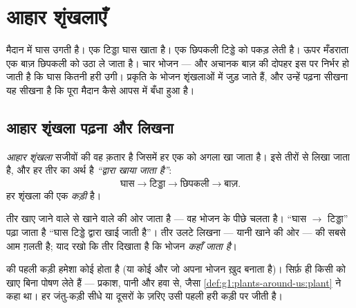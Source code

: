 \chapter{आहार शृंखलाएँ}\label{ch:g3:food-chains}

मैदान में घास उगती है। एक टिड्डा घास खाता है। एक छिपकली टिड्डे को पकड़
लेती है। ऊपर मँडराता एक बाज़ छिपकली को उठा ले जाता है। चार भोजन --- और
अचानक बाज़ की दोपहर इस पर निर्भर हो जाती है कि घास कितनी हरी उगी।
प्रकृति के भोजन शृंखलाओं में जुड़ जाते हैं, और उन्हें पढ़ना सीखना यह
सीखना है कि पूरा मैदान कैसे आपस में बँधा हुआ है।

\section{आहार शृंखला पढ़ना और लिखना}

\begin{definition}[आहार शृंखला]\label{def:g3:food-chains:chain}
\emph{आहार शृंखला} सजीवों की वह क़तार है जिसमें हर
एक को अगला खा जाता है। इसे तीरों से लिखा जाता है, और हर तीर का अर्थ है
\emph{``द्वारा खाया जाता है''}:
\[
\text{घास} \longrightarrow \text{टिड्डा}
\longrightarrow \text{छिपकली} \longrightarrow \text{बाज़}.
\]
हर  शृंखला की एक \emph{कड़ी} है।
\end{definition}

\begin{remark}[तीर की दिशा का ध्यान रखो]\label{rem:g3:food-chains:arrow}
तीर खाए जाने वाले से खाने वाले की ओर जाता है --- वह भोजन के पीछे चलता
है। ``घास $\rightarrow$ टिड्डा'' पढ़ा जाता है ``घास टिड्डे द्वारा खाई
जाती है''। तीर उलटे लिखना --- यानी खाने की ओर ---  की सबसे
आम ग़लती है; याद रखो कि तीर दिखाता है कि भोजन \emph{कहाँ जाता है}।
\end{remark}

\begin{proposition}[हर शृंखला किसी पौधे से शुरू होती है]\label{prop:g3:food-chains:start}
 की पहली कड़ी हमेशा कोई  होता है (या कोई और  जो
अपना भोजन ख़ुद बनाता है)। सिर्फ़  ही किसी को खाए बिना पोषण लेते हैं
--- प्रकाश, पानी और हवा से, जैसा \cref{def:g1:plants-around-us:plant}
ने कहा था। हर जंतु-कड़ी सीधे या दूसरों के ज़रिए उसी पहली हरी कड़ी पर
जीती है।
\end{proposition}
\admitted

